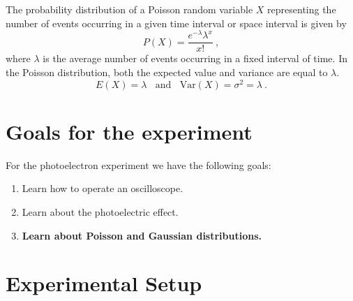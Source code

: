 \documentclass[10pt,aps,twocolumn,secnumarabic,balancelastpage,amsmath,amssymb,nofootinbib,floatfix]{revtex4}
\begin{document}
The probability distribution of a Poisson random variable $X$ representing the number of events occurring in a given time interval or space interval is given by
\begin{equation}
  P(X) = \frac{e^{-\lambda} \lambda^{x}}{x!} \ ,
\end{equation}
where $\lambda$ is the average number of events occurring in a fixed interval of time. In the Poisson distribution, both the expected value and variance are equal to $\lambda$. 
\begin{equation}
  E(X) = \lambda ~~~~\text {and} ~~~~ \text{Var}(X) = \sigma^2 = \lambda \ .
\end{equation}

\section{Goals for the experiment}

For the photoelectron experiment we have the following goals:
\begin{enumerate}
\item Learn how to operate an oscilloscope.
\item Learn about the photoelectric effect.
\item {\bf Learn about Poisson and Gaussian distributions.}
\end{enumerate}

\section{Experimental Setup}
\end{document}
